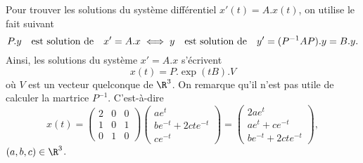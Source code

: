 {\begin{enumerate}
{Pour trouver les solutions du système différentiel $x'(t)=A.x(t)$, on utilise le fait suivant
$$P.y\quad{\hbox{est solution de}}\quad x'=A.x\iff y\quad{\hbox{est solution de}}\quad y'=(P^{-1}AP).y=B.y.$$
Ainsi, les solutions du système $x'=A.x$ s'écrivent
$$x(t)=P.\exp(tB).V$$
où $V$ est un vecteur quelconque de $\R^3$. On remarque qu'il n'est pas utile de calculer la martrice $P^{-1}$. C'est-à-dire
$$x(t)=\begin{pmatrix}2 & 0 & 0 \\  1&0&1 \\ 0&1&0\end{pmatrix}\begin{pmatrix}ae^t  \\  be^{-t}+2cte^{-t} \\  ce^{-t}\end{pmatrix}=\begin{pmatrix}2ae^t  \\  ae^{t}+ce^{-t} \\  be^{-t}+2cte^{-t}\end{pmatrix},$$
$(a,b,c)\in\R^3$.}
\end{enumerate}
}